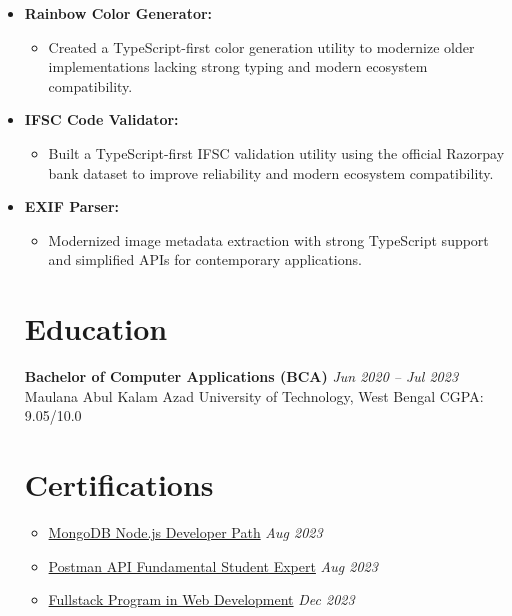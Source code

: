 \documentclass[10pt,a4paper]{article}
\begin{document}
{\begin{itemize}[leftmargin=*, noitemsep]
    \item \textbf{Rainbow Color Generator:}
    \begin{itemize}[leftmargin=*, noitemsep, topsep=2pt]
    \item Created a TypeScript-first color generation utility to modernize older implementations lacking strong typing and modern ecosystem compatibility.
    \end{itemize}
   
    \item \textbf{IFSC Code Validator:}
    \begin{itemize}[leftmargin=*, noitemsep, topsep=2pt]
    \item Built a TypeScript-first IFSC validation utility using the official Razorpay bank dataset to improve reliability and modern ecosystem compatibility.
   \end{itemize}

    \item \textbf{EXIF Parser:}
    \begin{itemize}[leftmargin=*, noitemsep, topsep=2pt]
    \item Modernized image metadata extraction with strong TypeScript support and simplified APIs for contemporary applications.
    \end{itemize}

\section*{Education}
\vspace{-10pt}
\textbf{Bachelor of Computer Applications (BCA)} \hfill \textit{Jun 2020 – Jul 2023} \newline
\small{Maulana Abul Kalam Azad University of Technology, West Bengal}
\newline
\small{CGPA: 9.05/10.0}

\section*{Certifications}
\vspace{-10pt}
\begin{itemize}[leftmargin=*, noitemsep]
    \item \href{https://learn.mongodb.com/c/U2P6dWwiRzifJJPpkLv5vQ}{MongoDB Node.js Developer Path} \hfill \textit{Aug 2023}
    \item \href{https://verify.letsupgrade.in/certificate/LUEPAFSJUL123557}{Postman API Fundamental Student Expert} \hfill \textit{Aug 2023}
    \item \href{https://verify.letsupgrade.in/certificate/LUFS220162}{Fullstack Program in Web Development} \hfill \textit{Dec 2023}
\end{itemize}


\end{itemize}}
\end{document}

